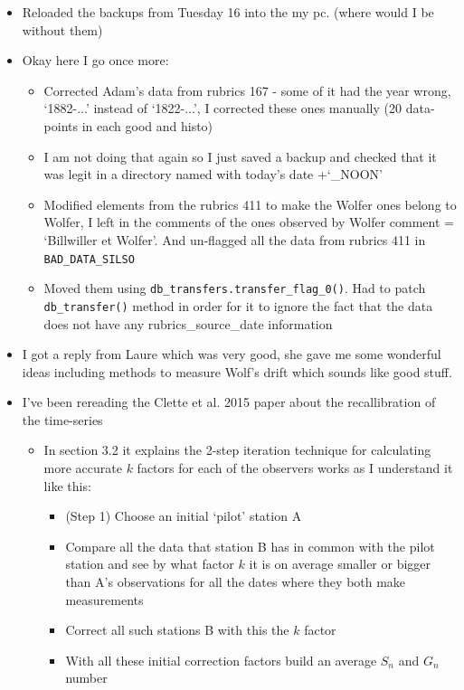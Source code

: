 \documentclass[12pt]{article}
\begin{document}
\begin{itemize}
    \item Reloaded the backups from Tuesday 16 into the my pc. (where would I be without them)
    \item Okay here I go once more:
    \begin{itemize}
        \item Corrected Adam's data from rubrics 167 - some of it had the year wrong, `1882-...' instead of `1822-...', I corrected these ones manually (20 data-points in each good and histo)
        \item I am not doing that again so I just saved a backup and checked that it was legit in a directory named with today's date +`\_NOON'
        \item Modified elements from the rubrics 411 to make the Wolfer ones belong to Wolfer, I left in the comments of the ones observed by Wolfer comment = `Billwiller et Wolfer'. And un-flagged all the data from rubrics 411 in \texttt{BAD\_DATA\_SILSO}
        \item Moved them using \texttt{db\_transfers.transfer\_flag\_0()}. Had to patch \texttt{db\_transfer()} method in order for it to ignore the fact that the data does not have any rubrics\_source\_date information
    \end{itemize}
    \item I got a reply from Laure which was very good, she gave me some wonderful ideas including methods to measure Wolf's drift which sounds like good stuff.
    \item I've been rereading the Clette et al. 2015 paper about the recallibration of the time-series
    \begin{itemize}
        \item In section 3.2 it explains the 2-step iteration technique for calculating more accurate $k$ factors for each of the observers works as I understand it like this: 
        \begin{itemize}
            \item (Step 1) Choose an initial `pilot' station A
            \item Compare all the data that station B has in common with the pilot station and see by what factor $k$ it is on average smaller or bigger than A's observations for all the dates where they both make measurements
            \item Correct all such stations B with this the $k$ factor
            \item With all these initial correction factors build an average $S_n$ and $G_n$ number

\end{itemize}
\end{itemize}
\end{itemize}
\end{document}

